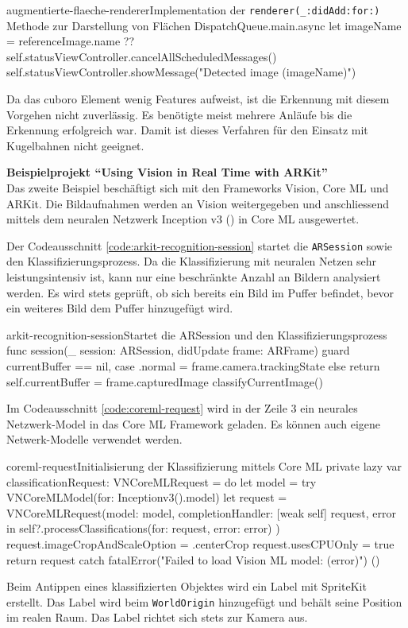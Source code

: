 \begin{description}
\begin{code}{augmentierte-flaeche-renderer}{Implementation der \texttt{renderer(\_:didAdd:for:)} Methode zur Darstellung von Flächen}
{			DispatchQueue.main.async {
				let imageName = referenceImage.name ?? 
				self.statusViewController.cancelAllScheduledMessages()
				self.statusViewController.showMessage("Detected image (imageName)")
			}
		}
	\end{code}

	Da das cuboro Element wenig Features aufweist, ist die Erkennung mit diesem Vorgehen nicht zuverlässig. Es benötigte meist mehrere Anläufe bis die Erkennung erfolgreich war. Damit ist dieses Verfahren für den Einsatz mit Kugelbahnen nicht geeignet.

	\textbf{Beispielprojekt "`Using Vision in Real Time with ARKit"'} \\
	Das zweite Beispiel beschäftigt sich mit den Frameworks Vision, Core ML und ARKit. Die Bildaufnahmen werden an Vision weitergegeben und anschliessend mittels dem neuralen Netzwerk Inception v3 (\cite{DBLP:journals/corr/SzegedyVISW15}) in Core ML ausgewertet. 

	Der Codeausschnitt \ref{code:arkit-recognition-session} startet die \texttt{ARSession} sowie den Klassifizierungsprozess. Da die Klassifizierung mit neuralen Netzen sehr leistungsintensiv ist, kann nur eine beschränkte Anzahl an Bildern analysiert werden. Es wird stets geprüft, ob sich bereits ein Bild im Puffer befindet, bevor ein weiteres Bild dem Puffer hinzugefügt wird.

	\begin{code}{arkit-recognition-session}{Startet die ARSession und den Klassifizierungsprozess}	
	func session(_ session: ARSession, didUpdate frame: ARFrame) {
		guard currentBuffer == nil, case .normal = frame.camera.trackingState else {
			return
		}
		self.currentBuffer = frame.capturedImage
		classifyCurrentImage()
	}
	\end{code}

	Im Codeausschnitt \ref{code:coreml-request} wird in der Zeile 3 ein neurales Netzwerk-Model in das Core ML Framework geladen. Es können auch eigene Netwerk-Modelle verwendet werden.
	\begin{code}{coreml-request}{Initialisierung der Klassifizierung mittels Core ML}
	private lazy var classificationRequest: VNCoreMLRequest = {
		do {
			let model = try VNCoreMLModel(for: Inceptionv3().model)
			let request = VNCoreMLRequest(model: model, completionHandler: { [weak self] request, error in
				self?.processClassifications(for: request, error: error)
			})
			request.imageCropAndScaleOption = .centerCrop
			request.usesCPUOnly = true
			return request
		} catch {
			fatalError("Failed to load Vision ML model: (error)")
		}
	}()
	\end{code}

	Beim Antippen eines klassifizierten Objektes wird ein Label mit SpriteKit erstellt. Das Label wird beim \texttt{WorldOrigin} hinzugefügt und behält seine Position im realen Raum. Das Label richtet sich stets zur Kamera aus.

\end{description}
